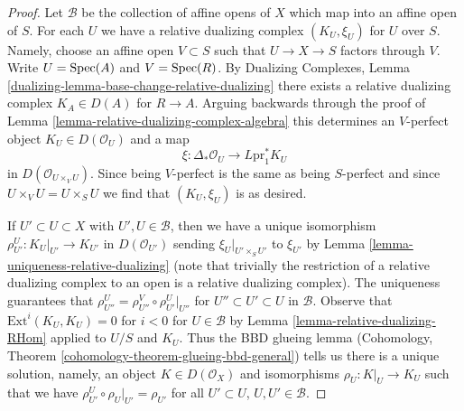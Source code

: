 \begin{proof}
Let $\mathcal{B}$ be the collection of affine opens of
$X$ which map into an affine open of $S$. For each $U$
we have a relative dualizing complex $(K_U, \xi_U)$ for
$U$ over $S$. Namely, choose an affine open
$V \subset S$ such that $U \to X \to S$ factors through $V$.
Write $U = \mathop{\mathrm{Spec}}(A)$ and $V = \mathop{\mathrm{Spec}}(R)$. By
Dualizing Complexes, Lemma \ref{dualizing-lemma-base-change-relative-dualizing}
there exists a relative dualizing complex $K_A \in D(A)$
for $R \to A$. Arguing backwards through the proof of
Lemma \ref{lemma-relative-dualizing-complex-algebra}
this determines an $V$-perfect object $K_U \in D(\mathcal{O}_U)$
and a map
$$
\xi : \Delta_*\mathcal{O}_U \to L\text{pr}_1^*K_U
$$
in $D(\mathcal{O}_{U \times_V U})$. Since being $V$-perfect is the
same as being $S$-perfect and since $U \times_V U = U \times_S U$
we find that $(K_U, \xi_U)$ is as desired.

\medskip\noindent
If $U' \subset U \subset X$ with $U', U \in \mathcal{B}$, then
we have a unique isomorphism $\rho_{U'}^U : K_U|_{U'} \to K_{U'}$
in $D(\mathcal{O}_{U'})$ sending $\xi_U|_{U' \times_S U'}$
to $\xi_{U'}$ by Lemma \ref{lemma-uniqueness-relative-dualizing}
(note that trivially the restriction of a relative dualizing
complex to an open is a relative dualizing complex).
The uniqueness guarantees that
$\rho^U_{U''} = \rho^V_{U''} \circ \rho ^U_{U'}|_{U''}$
for $U'' \subset U' \subset U$ in $\mathcal{B}$.
Observe that $\text{Ext}^i(K_U, K_U) = 0$ for $i < 0$
for $U \in \mathcal{B}$ by Lemma \ref{lemma-relative-dualizing-RHom}
applied to $U/S$ and $K_U$.
Thus the BBD glueing lemma
(Cohomology, Theorem \ref{cohomology-theorem-glueing-bbd-general})
tells us there is a unique solution, namely, an object
$K \in D(\mathcal{O}_X)$ and isomorphisms $\rho_U : K|_U \to K_U$
such that we have
$\rho^U_{U'} \circ \rho_U|_{U'} = \rho_{U'}$ for all $U' \subset U$,
$U, U' \in \mathcal{B}$.


\end{proof}
